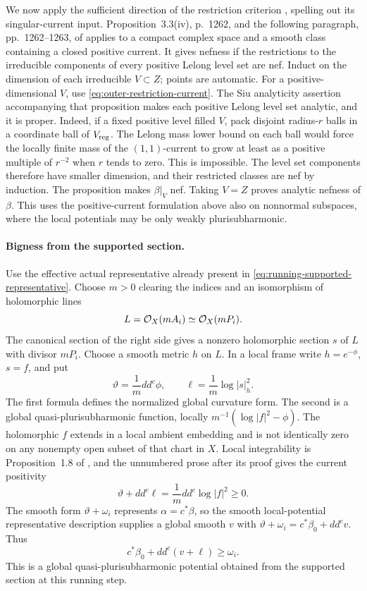 We now apply the sufficient direction of the restriction criterion
\cite[Theorem~2.36 and Remark~2.37]{DasHaconPaun2024}, spelling out its
singular-current input.  Proposition~3.3(iv), p.~1262, and the following
paragraph, pp.~1262--1263, of \cite{DemaillyPaun2004}
applies to a compact complex space and a smooth class containing a
closed positive current.  It gives nefness if the restrictions to the
irreducible components of every positive Lelong level set are nef.
Induct on the dimension of each irreducible \(V\subset Z\); points are
automatic.  For a positive-dimensional \(V\), use
\eqref{eq:outer-restriction-current}.  The Siu analyticity assertion
accompanying that proposition makes each positive Lelong level set
analytic, and it is proper.  Indeed, if a fixed positive level filled \(V\), pack
disjoint radius-\(r\) balls in a coordinate ball of \(V_{\rm reg}\).
The Lelong mass lower bound on each ball would force the locally finite
mass of the \((1,1)\)-current to grow at least as a positive multiple
of \(r^{-2}\) when \(r\) tends to zero.  This is impossible.  The level
set components therefore have smaller dimension, and their restricted
classes are nef by induction.  The proposition makes \(\beta|_V\) nef.
Taking \(V=Z\) proves analytic nefness of \(\beta\).  This uses the
positive-current formulation above also on nonnormal subspaces, where
the local potentials may be only weakly plurisubharmonic.

\paragraph{Bigness from the supported section.}
Use the effective actual representative already present in
\eqref{eq:running-supported-representative}.  Choose \(m>0\) clearing
the indices and an isomorphism of holomorphic lines
\[
 L=\mathcal O_X(mA_i)\simeq\mathcal O_X(mP_i).
\]
The canonical section of the right side gives a nonzero holomorphic
section \(s\) of \(L\) with divisor \(mP_i\).  Choose a smooth metric
\(h\) on \(L\).  In a local frame write \(h=e^{-\phi}\), \(s=f\),
and put
\[
 \vartheta=\frac1m dd^c\phi,\qquad
 \ell=\frac1m\log|s|_h^2.
\]
The first formula defines the normalized global curvature form.
The second is a global quasi-plurisubharmonic function, locally
\(m^{-1}(\log|f|^2-\phi)\).  The holomorphic \(f\) extends in a local
ambient embedding and is not identically zero on any nonempty open
subset of that chart in \(X\).  Local integrability is Proposition~1.8
of \cite[p.~19]{Demailly1985}, and
the unnumbered prose after its proof gives the current positivity
\[
 \vartheta+dd^c\ell=\frac1m dd^c\log|f|^2\geq0.
\]
The smooth form \(\vartheta+\omega_i\) represents
\(\alpha=c^*\beta\), so the smooth local-potential representative
description supplies a global smooth \(v\) with
\(\vartheta+\omega_i=c^*\beta_0+dd^c v\).  Thus
\begin{equation}\label{eq:outer-supported-current}
 c^*\beta_0+dd^c(v+\ell)\geq\omega_i.
\end{equation}
This is a global quasi-plurisubharmonic potential obtained from the
supported section at this running step.


